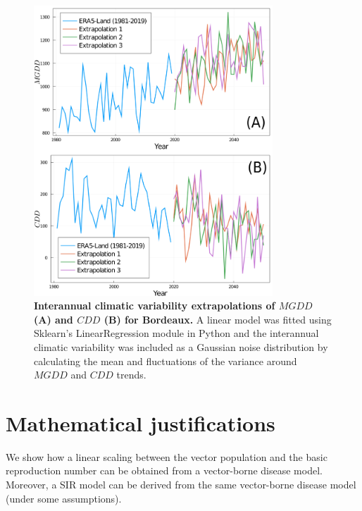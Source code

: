 \begin{figure}[H]
    \centering

    \includegraphics[width=0.8\textwidth]{Figures/MGDD_CDD_scenarios.png}
    \caption[Interannual climatic variability extrapolations of
        $MGDD$ and $CDD$]{\textbf{Interannual climatic
            variability extrapolations of
            $MGDD$	(A) and $CDD$ (B) for Bordeaux.} A linear model was
        fitted using
        Sklearn's LinearRegression module in Python and the interannual
        climatic
        variability was included as a Gaussian noise distribution by
        calculating the
        mean and fluctuations of the variance around $MGDD$ and $CDD$ trends.}
    \label{figS13} %
\end{figure}

\section{Mathematical justifications}\label{app:SIR_justifications}

We show how a linear scaling between the vector population and the basic
reproduction number can be obtained from a vector-borne disease model.
Moreover, a SIR model can be derived from the same vector-borne disease model
(under some assumptions).

